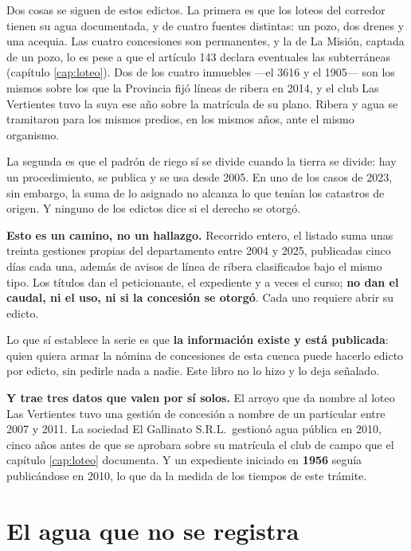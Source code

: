 \begin{cautela}
Dos cosas se siguen de estos edictos. La primera es que los loteos del corredor tienen su agua documentada, y de cuatro fuentes distintas: un pozo, dos drenes y una acequia. Las cuatro concesiones son permanentes, y la de La Misión, captada de un pozo, lo es pese a que el artículo 143 declara eventuales las subterráneas (capítulo \ref{cap:loteo}). Dos de los cuatro inmuebles ---el 3616 y el 1905--- son los mismos sobre los que la Provincia fijó líneas de ribera en 2014, y el club Las Vertientes tuvo la suya ese año sobre la matrícula de su plano. Ribera y agua se tramitaron para los mismos predios, en los mismos años, ante el mismo organismo.

La segunda es que el padrón de riego sí se divide cuando la tierra se divide: hay un procedimiento, se publica y se usa desde 2005. En uno de los casos de 2023, sin embargo, la suma de lo asignado no alcanza lo que tenían los catastros de origen. Y ninguno de los edictos dice si el derecho se otorgó.
\end{cautela}

\begin{cautela}
\textbf{Esto es un camino, no un hallazgo.} Recorrido entero, el listado suma unas treinta gestiones propias del departamento entre 2004 y 2025, publicadas cinco días cada una, además de avisos de línea de ribera clasificados bajo el mismo tipo. Los títulos dan el peticionante, el expediente y a
veces el curso; \textbf{no dan el caudal, ni el uso, ni si la concesión se otorgó}. Cada uno
requiere abrir su edicto.

Lo que sí establece la serie es que \textbf{la información existe y está publicada}: quien
quiera armar la nómina de concesiones de esta cuenca puede hacerlo edicto por edicto, sin pedirle
nada a nadie. Este libro no lo hizo y lo deja señalado.

\textbf{Y trae tres datos que valen por sí solos.} El arroyo que da nombre al loteo Las
Vertientes tuvo una gestión de concesión a nombre de un particular entre 2007 y 2011. La
sociedad El Gallinato S.R.L.\ gestionó agua pública en 2010, cinco años antes de que se
aprobara sobre su matrícula el club de campo que el capítulo \ref{cap:loteo} documenta. Y un
expediente iniciado en \textbf{1956} seguía publicándose en 2010, lo que da la medida de los
tiempos de este trámite.
\end{cautela}

\section{El agua que no se registra}


